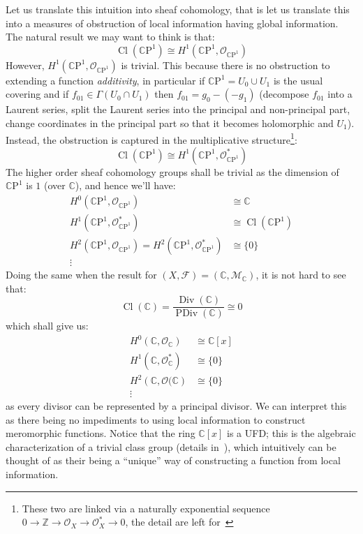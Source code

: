 \documentclass{book}
\newcommand{\C}{{\mathbb{C}}}
\newcommand{\Z}{{\mathbb{Z}}}
\newcommand{\CF}{{\mathcal{F}}}
\newcommand{\CM}{{\mathcal{M}}}
\newcommand{\CO}{{\mathcal{O}}}
\newcommand{\CP}{\mathbb{C}\mathrm{P}}
\newcommand{\Cl}{{\operatorname{Cl}}}
\newcommand{\Div}{{\operatorname{Div}}}
\newcommand{\PDiv}{{\operatorname{PDiv}}}
\begin{document}
Let us translate this intuition into sheaf cohomology, that is let us translate this into a  measures of
obstruction of local information having global information. The natural result we may want to think is that:
\[
  \Cl(\CP^1) \cong H^1(\CP^1, \CO_{\CP^1})
\]
However, $H^1(\CP^1, \CO_{\CP^1})$ is trivial. This because there is no obstruction to extending a function
\emph{additivity}, in particular if $\CP^1 = U_0 \cup U_1$ is the usual covering and if $f_{01} \in
\Gamma(U_0\cap U_1)$ then $f_{01} = g_0 - (-g_1)$ (decompose $f_{01}$ into a Laurent series, split the Laurent
series into the principal and non-principal part, change coordinates in the principal part so that it becomes
holomorphic and $U_1$). Instead, the obstruction is captured in the multiplicative structure\footnote{These
two are linked via a naturally exponential sequence $0 \to \Z \to \CO_X \to \CO_X^* \to 0$, the detail are
left for~\cite{NateAlgGeo}}:
\[
  \Cl(\CP^1) \cong H^1(\CP^1, \CO_{\CP^1}^*)
\]
The
higher order sheaf cohomology groups shall be trivial as the dimension of $\CP^1$ is $1$ (over $\C$), and
hence we'll have:
\begin{align*}
  H^0(\CP^1, \CO_{\CP^1}) &\cong \C\\
  H^1(\CP^1, \CO_{\CP^1}^*) &\cong \Cl(\CP^1)\\
  H^2(\CP^1, \CO_{\CP^1}) = H^2(\CP^1, \CO_{\CP^1}^*)&\cong \{0\}\\
  \vdots
\end{align*}
Doing the same when the result for $(X, \CF) = (\C, \CM_\C)$, it is not hard to see that:
\[
  \Cl(\C) = \frac{\Div(\C)}{\PDiv(\C)} \cong 0
\]
which shall give us:
\begin{align*}
  H^0(\C, \CO_{\C}) &\cong \C[x]\\
  H^1(\C, \CO_{\C}^*) &\cong \{0\}\\
  H^2(\C, \CO{(\C}) &\cong \{0\}\\
  \vdots
\end{align*}
as every divisor can be represented by a principal divisor. We can interpret this as there being no
impediments to using local information to construct meromorphic functions. Notice that the ring $\C[x]$ is
a UFD; this is the algebraic characterization of a trivial class group (details in~\cite{NateAlgGeo}), which
intuitively can be thought of as their being a ``unique'' way of constructing a function from local
information.
\end{document}
